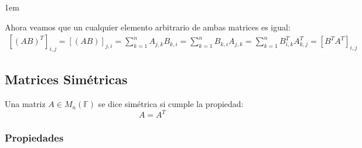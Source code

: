 \documentclass[12pt, fleqn]{report}                             %
\newenvironment{SmallIndentation}[1][0.75em]                    %
    {\begin{adjustwidth}{#1}{}\begin{footnotesize}}                 %
    {\end{footnotesize}\end{adjustwidth}}                           %
\begin{document}
\begin{itemize}
\begin{SmallIndentation}[1em]
                            Ahora veamos que un cualquier elemento arbitrario de ambas matrices es igual:
                            \begin{equation*}
                            \begin{split}
                                [(AB)^T]_{i, j}     
                                    = [(AB)]_{j, i} = \sum_{k=1}^{n} A_{j, k}B_{k, i} 
                                    = \sum_{k=1}^{n} B_{k, i} A_{j, k}   
                                    = \sum_{k=1}^{n} B^T_{i, k} A^T_{k, j}            
                                = [B^T A^T]_{i, j}
                            \end{split}
                            \end{equation*}

                        \end{SmallIndentation}

                \end{itemize}


                        
            \clearpage
            \subsection{Matrices Simétricas}

                Una matriz $A \in M_{n}(\mathbb{F})$ se dice simétrica si cumple la propiedad:
                \begin{equation}
                    A = A^T
                \end{equation}

                \subsubsection{Propiedades}
\end{document}
